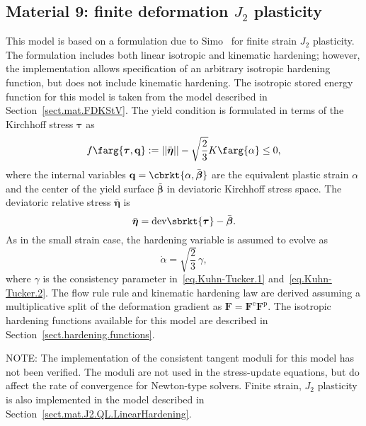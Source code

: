 \subsection{Material 9: finite deformation $J_{2}$ plasticity}
\label{sect.mat.FD.J2.C0.Hardening}
This model is based on a formulation due to Simo~\cite{Simo1988a,Simo1988b}
for finite strain $J_{2}$ plasticity. The formulation includes
both linear isotropic and kinematic hardening; however, the 
implementation allows specification of an arbitrary isotropic hardening 
function, but does not include kinematic hardening.
The isotropic stored energy function for this model is taken from the 
model described in Section~\ref{sect.mat.FDKStV}. 
The yield condition is formulated in terms of the
Kirchhoff stress $\boldsymbol{\tau}$ as
\begin{equation}
	f\farg{\boldsymbol{\tau}, \mathbf{q}} := 
	||\bar{\boldsymbol{\eta}}|| 
	- \sqrt{\frac{2}{3}} K\farg{\alpha} \le 0,
\end{equation}
where the internal variables 
$\mathbf{q} = \cbrkt{\alpha, \bar{\boldsymbol{\beta}}}$ are
the equivalent plastic strain $\alpha$ and the center of
the yield surface $\bar{\boldsymbol{\beta}}$ in deviatoric
Kirchhoff stress space. The deviatoric relative stress 
$\bar{\boldsymbol{\eta}}$ is
\begin{equation}
\bar{\boldsymbol{\eta}} = \textrm{dev}\sbrkt{\boldsymbol\tau} - 
\bar{\boldsymbol{\beta}}.
\end{equation}
As in the small strain case, the hardening variable is assumed
to evolve as
\begin{equation}
\dot{\alpha} = \sqrt{\frac{2}{3}}\,\gamma,	
\end{equation}
where $\gamma$ is the consistency parameter 
in~\eqref{eq.Kuhn-Tucker.1} and~\eqref{eq.Kuhn-Tucker.2}.
The flow rule rule and kinematic hardening law are derived
assuming a multiplicative split of the deformation gradient
as $\mathbf{F} = \mathbf{F}^{\textrm{e}} \mathbf{F}^{\textrm{p}}$.
The isotropic hardening functions available for this model are 
described in Section~\ref{sect.hardening.functions}.

NOTE: The implementation of the consistent tangent moduli for this model 
has not been verified. The moduli are not used in the stress-update 
equations, but do affect the rate of convergence for Newton-type 
solvers. Finite strain, $J_{2}$ plasticity is also implemented in the model
described in Section~\ref{sect.mat.J2.QL.LinearHardening}.

